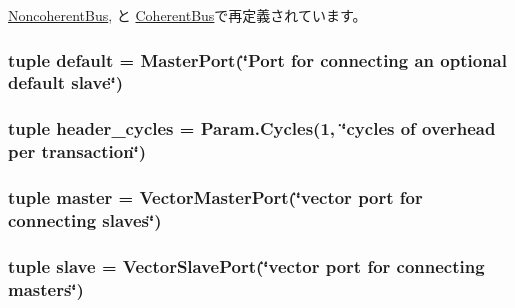 \hyperlink{classBus_1_1NoncoherentBus_a17da7064bc5c518791f0c891eff05fda}{NoncoherentBus}, と \hyperlink{classBus_1_1CoherentBus_a17da7064bc5c518791f0c891eff05fda}{CoherentBus}で再定義されています。\hypertarget{classBus_1_1BaseBus_a3abc3c22bdb6b98ef48db57a33e92331}{
\subsubsection[{default}]{\setlength{\rightskip}{0pt plus 5cm}tuple {\bf default} = {\bf MasterPort}(\char`\"{}Port for connecting an optional {\bf default} {\bf slave}\char`\"{})}}
\label{classBus_1_1BaseBus_a3abc3c22bdb6b98ef48db57a33e92331}
\hypertarget{classBus_1_1BaseBus_a955befffdaffa7d3695a8a6730cb058e}{
\subsubsection[{header\_\-cycles}]{\setlength{\rightskip}{0pt plus 5cm}tuple {\bf header\_\-cycles} = Param.Cycles(1, \char`\"{}cycles of overhead per transaction\char`\"{})}}
\label{classBus_1_1BaseBus_a955befffdaffa7d3695a8a6730cb058e}
\hypertarget{classBus_1_1BaseBus_a0f74d64e6817f0f89bafc52ff3c56cbb}{
\subsubsection[{master}]{\setlength{\rightskip}{0pt plus 5cm}tuple {\bf master} = {\bf VectorMasterPort}(\char`\"{}vector port for connecting slaves\char`\"{})}}
\label{classBus_1_1BaseBus_a0f74d64e6817f0f89bafc52ff3c56cbb}
\hypertarget{classBus_1_1BaseBus_a9b8cb1f697e86858437a78f041478c9b}{
\subsubsection[{slave}]{\setlength{\rightskip}{0pt plus 5cm}tuple {\bf slave} = {\bf VectorSlavePort}(\char`\"{}vector port for connecting masters\char`\"{})}}
